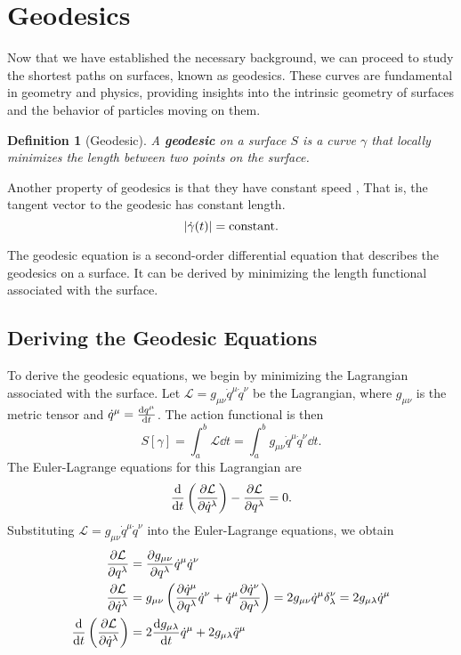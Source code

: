 \documentclass[12pt]{article}
\newtheorem{definition}{Definition}[section]
\begin{document}
\section{Geodesics}

Now that we have established the necessary background, we can proceed to study the shortest paths on surfaces, known as geodesics.
These curves are fundamental in geometry and physics, providing insights into the intrinsic geometry of surfaces and the behavior of particles moving on them.

\begin{definition}[Geodesic]
    A \textbf{geodesic} on a surface $S$ is a curve $\gamma$ that locally minimizes the length between two points on the surface.
\end{definition}

Another property of geodesics is that they have constant speed \cite{Oprea2007}, That is, the tangent vector to the geodesic has constant length.
\[
    \abs{\dot{\gamma}(t)} = \text{constant}.
\]

The geodesic equation is a second-order differential equation that describes the geodesics on a surface.
It can be derived by minimizing the length functional associated with the surface.

\subsection{Deriving the Geodesic Equations}

To derive the geodesic equations, we begin by minimizing the Lagrangian associated with the surface.
Let $\mathcal{L} = g_{\mu\nu} \dot{q}^\mu \dot{q}^\nu$ be the Lagrangian, where $g_{\mu\nu}$ is the metric tensor and $\dot{q}^\mu = \dv{q^\mu}{t}$.
The action functional is then
\[
    S[\gamma] = \int_{a}^{b} \mathcal{L} \dd{t} = \int_{a}^{b} g_{\mu\nu} \dot{q}^\mu \dot{q}^\nu \dd{t}.
\]
The Euler-Lagrange equations for this Lagrangian are
\[
    \dv{t} \left( \pdv{\mathcal{L}}{\dot{q}^\lambda} \right) - \pdv{\mathcal{L}}{q^\lambda} = 0.
\]
Substituting $\mathcal{L} = g_{\mu\nu} \dot{q}^\mu \dot{q}^\nu$ into the Euler-Lagrange equations, we obtain
\begin{align*}
    \pdv{\mathcal{L}}{q^{\lambda}} &= \pdv{g_{\mu\nu}}{q^{\lambda}} \dot{q}^{\mu} \dot{q}^{\nu}  \\
    \pdv{\mathcal{L}}{\dot{q}^{\lambda}} &= g_{\mu\nu} \left( \pdv{\dot{q}^{\mu}}{q^{\lambda}} \dot{q}^{\nu} + \dot{q}^{\mu} \pdv{\dot{q}^{\nu}}{q^{\lambda}} \right) = 2 g_{\mu\nu} \dot{q}^{\mu} \delta_{\lambda}^{\nu} = 2 g_{\mu\lambda} \dot{q}^{\mu} \\
    \dv{t} \left( \pdv{\mathcal{L}}{\dot{q}^{\lambda}} \right) &= 2 \dv{g_{\mu\lambda}}{t} \dot{q}^{\mu} + 2 g_{\mu\lambda} \ddot{q}^{\mu} \\
\end{align*}
\end{document}

